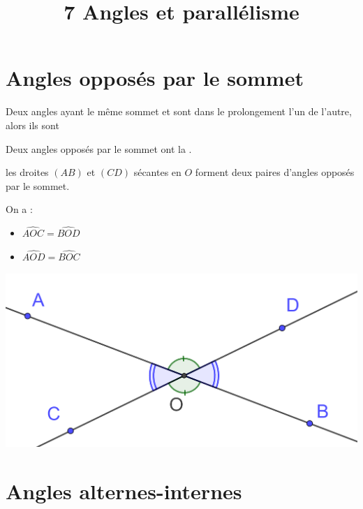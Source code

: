 \documentclass[12pt,a4paper]{article}
\date{}
\title{\textcircled{{\normalsize{7}}} Angles et parallélisme}
\begin{document}
\maketitle








\section{Angles opposés par le sommet}


\begin{mydef}
	Deux angles ayant le même sommet et sont dans le prolongement l'un de l'autre, alors ils sont 
\end{mydef}

\begin{myprop}
	Deux angles opposés par le sommet ont la .
\end{myprop}


\begin{myex}
	
	\begin{multicols}{2}
		les droites $(AB)$ et $(CD)$ sécantes en $O$ forment deux paires d'angles opposés par le sommet.
		
		On a :
		\begin{itemize}
			\item $\widehat{AOC} = \widehat{BOD}$
			\item $\widehat{AOD} = \widehat{BOC}$
		\end{itemize}	
	
		\includegraphics[scale=0.15]{opposes}
	\end{multicols}
	
\end{myex}
\section{Angles alternes-internes}
\end{document}
